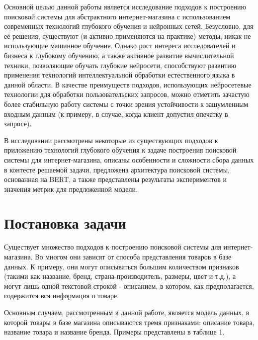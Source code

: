 \documentclass[12pt,a4paper]{article}
\begin{document}
Основной целью данной работы является исследование подходов к построению поисковой системы для абстрактного интернет-магазина с использованием современных технологий глубокого обучения и нейронных сетей. Безусловно, для её решения, существуют (и активно применяются на практике) методы, никак не использующие машинное обучение. Однако рост интереса исследователей и бизнеса к глубокому обучению, а также активное развитие вычислительной техники, позволяющие обучать глубокие нейросети, способствуют развитию применения технологий интеллектуальной обработки естественного языка в данной области. В качестве преимуществ подходов, использующих нейросетевые технологии для обработки пользовательских запросов, можно отметить зачастую более стабильную работу системы с точки зрения устойчивости к зашумленным входным данным (к примеру, в случае, когда клиент допустил опечатку в запросе).

В исследовании рассмотрены некоторые из существующих подходов к приложению технологий глубокого обучения к задаче построения поисковой системы для интернет-магазина, описаны особенности и сложности сбора данных в контесте решаемой задачи, предложена архитектура поисковой системы, основанная на BERT\cite{bert}, а также представлены результаты экспериментов и значения метрик для предложенной модели. 

\section{Постановка задачи}

Существует множество подходов к построению поисковой системы для интернет-магазина. Во многом они зависят от способа представления товаров в базе данных. К примеру, они могут описываться большим количеством признаков (такими как название, бренд, страна-производитель, размеры, цвет и т.д.), а могут лишь одной текстовой строкой - описанием, в котором, как предполагается, содержится вся информация о товаре.

Основным случаем, рассмотренным в данной работе, является модель данных, в которой товары в базе магазина описываются тремя признаками: описание товара, название товара и название бренда. Примеры представлены в таблице 1.
\end{document}
